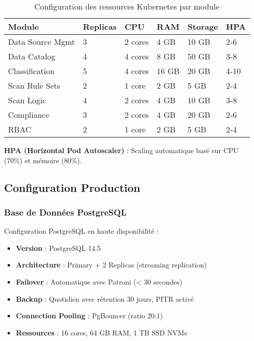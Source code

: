 \begin{table}[htpb]
\centering
\caption{Configuration des ressources Kubernetes par module}
\label{tab:ressources_kubernetes}
\begin{tabular}{|p{}|p{}|p{}|p{}|p{}|p{}|}
\hline
\textbf{Module} & \textbf{Replicas} & \textbf{CPU} & \textbf{RAM} & \textbf{Storage} & \textbf{HPA} \\
\hline
Data Source Mgmt & 3 & 2 cores & 4 GB & 10 GB & 2-6 \\
\hline
Data Catalog & 4 & 4 cores & 8 GB & 50 GB & 3-8 \\
\hline
Classification & 5 & 4 cores & 16 GB & 20 GB & 4-10 \\
\hline
Scan Rule Sets & 2 & 1 core & 2 GB & 5 GB & 2-4 \\
\hline
Scan Logic & 4 & 2 cores & 4 GB & 10 GB & 3-8 \\
\hline
Compliance & 3 & 2 cores & 4 GB & 20 GB & 2-6 \\
\hline
RBAC & 2 & 1 core & 2 GB & 5 GB & 2-4 \\
\hline
\end{tabular}
\end{table}

\textbf{HPA (Horizontal Pod Autoscaler)} : Scaling automatique basé sur CPU (70\%) et mémoire (80\%).

\subsection{Configuration Production}

\subsubsection{Base de Données PostgreSQL}

Configuration PostgreSQL en haute disponibilité :
\begin{itemize}
    \item \textbf{Version} : PostgreSQL 14.5
    \item \textbf{Architecture} : Primary + 2 Replicas (streaming replication)
    \item \textbf{Failover} : Automatique avec Patroni (< 30 secondes)
    \item \textbf{Backup} : Quotidien avec rétention 30 jours, PITR activé
    \item \textbf{Connection Pooling} : PgBouncer (ratio 20:1)
    \item \textbf{Ressources} : 16 cores, 64 GB RAM, 1 TB SSD NVMe
\end{itemize}

